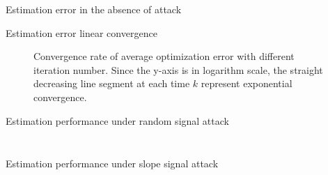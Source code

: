 \documentclass[10pt]{beamer}
\begin{document}
\begin{frame}{Estimation error in the absence of attack}
	\begin{figure}[htpb!]
		\centering
		
	\end{figure}
\end{frame}

\begin{frame}{Estimation error linear convergence }
\begin{figure}[htpb!]
	\centering
	
	\caption{Convergence rate of average optimization error with different iteration number. Since the y-axis is in logarithm scale, the straight decreasing line segment at each time $k$ represent exponential convergence.} \label{fig:no_attack_converge}
\end{figure}
\end{frame}

\begin{frame}{Estimation performance under random signal attack}
  \begin{columns}
    \begin{column}{0.5\textwidth}
	\begin{figure}[htpb!]
		\resizebox{0.8\textheight}{0.8\textheight}{%
			
		}
\end{figure}
    \end{column}
    \begin{column}{0.5\textwidth}
     \begin{figure}[htpb!]\vspace{90pt}
     	\resizebox{0.5\textheight}{0.5\textheight}{	  }
     \end{figure}
    \end{column}
  \end{columns}

\end{frame}


\begin{frame}{Estimation performance under slope signal attack}
  \begin{columns}
	\begin{column}{0.5\textwidth}
		\begin{figure}[htpb!]
			\resizebox{0.8\textheight}{0.8\textheight}{%
				
			}
		\end{figure}
	\end{column}
	\begin{column}{0.5\textwidth}
		\begin{figure}[htpb!]\vspace{90pt}
			\resizebox{0.5\textheight}{0.5\textheight}{	  }
		\end{figure}
	\end{column}
\end{columns}
	
\end{frame}
\end{document}
